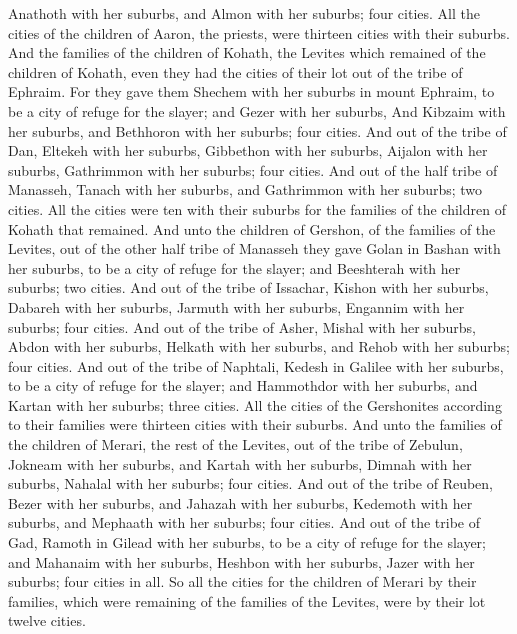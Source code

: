 \begin{biblechapter}
\verse Anathoth with her suburbs, and Almon with her suburbs; four cities.
\verse All the cities of the children of Aaron, the priests, were thirteen cities with their suburbs.
\verse And the families of the children of Kohath, the Levites which remained of the children of Kohath, even they had the cities of their lot out of the tribe of Ephraim.
\verse For they gave them Shechem with her suburbs in mount Ephraim, to be a city of refuge for the slayer; and Gezer with her suburbs,
\verse And Kibzaim with her suburbs, and Bethhoron with her suburbs; four cities.
\verse And out of the tribe of Dan, Eltekeh with her suburbs, Gibbethon with her suburbs,
\verse Aijalon with her suburbs, Gathrimmon with her suburbs; four cities.
\verse And out of the half tribe of Manasseh, Tanach with her suburbs, and Gathrimmon with her suburbs; two cities.
\verse All the cities were ten with their suburbs for the families of the children of Kohath that remained.
\verse And unto the children of Gershon, of the families of the Levites, out of the other half tribe of Manasseh they gave Golan in Bashan with her suburbs, to be a city of refuge for the slayer; and Beeshterah with her suburbs; two cities.
\verse And out of the tribe of Issachar, Kishon with her suburbs, Dabareh with her suburbs,
\verse Jarmuth with her suburbs, Engannim with her suburbs; four cities.
\verse And out of the tribe of Asher, Mishal with her suburbs, Abdon with her suburbs,
\verse Helkath with her suburbs, and Rehob with her suburbs; four cities.
\verse And out of the tribe of Naphtali, Kedesh in Galilee with her suburbs, to be a city of refuge for the slayer; and Hammothdor with her suburbs, and Kartan with her suburbs; three cities.
\verse All the cities of the Gershonites according to their families were thirteen cities with their suburbs.
\verse And unto the families of the children of Merari, the rest of the Levites, out of the tribe of Zebulun, Jokneam with her suburbs, and Kartah with her suburbs,
\verse Dimnah with her suburbs, Nahalal with her suburbs; four cities.
\verse And out of the tribe of Reuben, Bezer with her suburbs, and Jahazah with her suburbs,
\verse Kedemoth with her suburbs, and Mephaath with her suburbs; four cities.
\verse And out of the tribe of Gad, Ramoth in Gilead with her suburbs, to be a city of refuge for the slayer; and Mahanaim with her suburbs,
\verse Heshbon with her suburbs, Jazer with her suburbs; four cities in all.
\verse So all the cities for the children of Merari by their families, which were remaining of the families of the Levites, were by their lot twelve cities.

\end{biblechapter}

